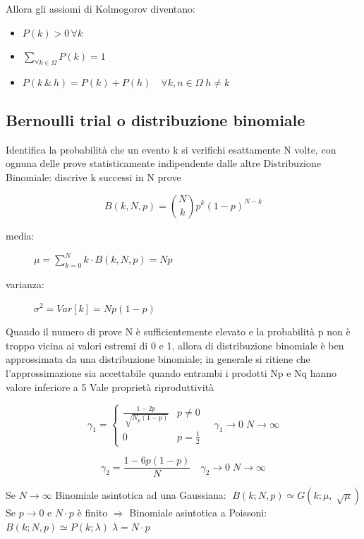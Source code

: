 \documentclass[12pt]{report}
\theoremstyle{remark}
\theoremstyle{theorem}
\begin{document}
\noindent Allora gli assiomi di Kolmogorov diventano:

\begin{itemize}
	\item $P(k)>0 \, \forall k$
	\item $\sum_{\forall k\in \Omega} P(k) = 1$
	\item $P(k\, \&\, h) = P(k) + P(h) \quad \forall k,n \in \Omega \; h \neq k$
\end{itemize}

\subsection*{Bernoulli trial o distribuzione binomiale}
Identifica la probabilità che un evento k si verifichi esattamente N volte, con ognuna delle prove statisticamente indipendente dalle altre
Distribuzione Binomiale: discrive k successi in N prove

\[B(k,N,p) = \binom{N}{k} p^k {(1-p)^{N-k}}\]

\begin{description}
	\item[media:] \; $\mu = \displaystyle \sum_{k=0}^N k\cdot B(k,N,p) = Np$
	\item[varianza:] \; $\sigma^2 = Var[k] = Np(1-p)$ 
\end{description}
\noindent Quando il numero di prove N è sufficientemente elevato e la probabilità p non è troppo vicina ai valori estremi di 0 e 1, allora di distribuzione binomiale è ben approssimata da una distribuzione binomiale; in generale si ritiene che l'approssimazione sia accettabile quando entrambi i prodotti Np e Nq hanno valore inferiore a 5 \newline
Vale proprietà riproduttività

\[\gamma_1 = 
\begin{cases}
	\frac{1-2p}{\sqrt[]{N_p(1-p)}} & p \neq 0\\
	0 & p= {\frac{1}{2}}	
\end{cases}\quad \gamma_1 \to 0\; N\to \infty\]

\[\gamma_2 = \frac{1-6p(1-p)}{N} \quad \gamma_2 \to 0 \; N\to\infty\]

\noindent Se $N\to\infty$ Binomiale asintotica ad una Gaussiana: $ \; B(k;N,p) \simeq G(k;\mu,\sqrt[]{\mu})$ \newline
Se $p\to 0$ e $N\cdot p$ è finito $\Rightarrow$ Binomiale asintotica a Poissoni: \; $B(k;N,p) \simeq P(k;\lambda) \; \lambda=N\cdot p$
\end{document}
